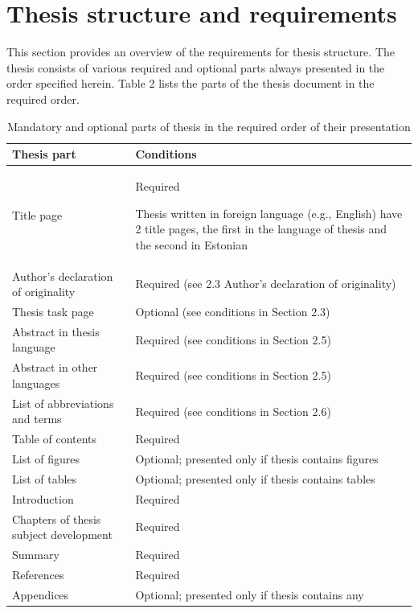 \section{Thesis structure and requirements}

This section provides an overview of the requirements for thesis structure. The thesis consists of various required and optional parts always presented in the order specified herein. Table 2 lists the parts of the thesis document in the required order.


\begin{table}[!h]
\caption{Mandatory and optional parts of thesis in the required order of their presentation}
\centering
\begin{tabular}{|L{5.1cm}|L{9.1cm}|}
\hline
\textbf{Thesis part} &  \textbf{Conditions}\\  \hline

Title page & Required 

Thesis written in foreign language (e.g., English) have
2 title pages, the first in the language of thesis and the
second in Estonian\\ \hline

Author’s declaration of originality & Required (see 2.3 Author’s declaration of originality) \\ \hline
Thesis task page & Optional (see conditions in Section 2.3) \\ \hline
Abstract in thesis language & Required (see conditions in Section 2.5) \\\hline
Abstract in other languages & Required (see conditions in Section 2.5) \\\hline
List of abbreviations and terms & Required (see conditions in Section 2.6) \\\hline
Table of contents  & Required \\\hline
List of figures &  Optional; presented only if thesis contains figures \\\hline
List of tables  & Optional; presented only if thesis contains tables \\\hline
Introduction  &Required \\\hline
Chapters of thesis subject  development  &Required \\\hline
Summary  &Required \\\hline
References  &Required \\\hline
Appendices  &Optional; presented only if thesis contains any\\\hline
\end{tabular}
\end{table}

